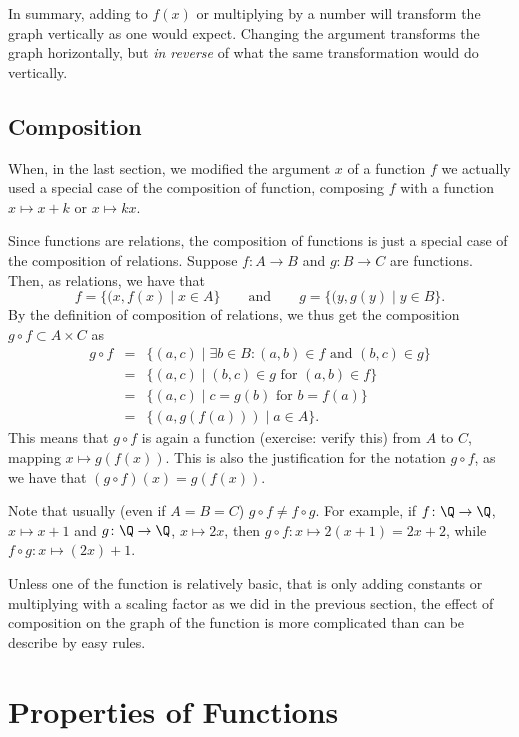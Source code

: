In summary, adding to $f(x)$ or multiplying by a number will transform the graph
vertically as one would expect. Changing the argument transforms the graph horizontally,
but {\em in reverse} of what the same transformation would do vertically.

\subsection{Composition}
\label{secfunccomposition}

When, in the last section, we modified the argument $x$ of a function $f$ we actually
used a special case of the composition of function, composing $f$ with a function
$x\mapsto x+k$ or $x\mapsto kx$.

Since functions are relations, the composition of functions is just a special case of
the composition of relations. Suppose $f\colon A\to B$ and $g\colon B\to C$ are
functions. Then, as relations, we have that 
\[
f=\{(x,f(x)\mid x\in A\}
\qquad\mbox{and}\qquad
g=\{(y,g(y)\mid y\in B\}.
\]
By the definition of composition of relations, we thus get the composition $g\circ
f\subset A\times C$ as
\begin{eqnarray*}
g\circ f&=&\{(a,c)\mid \exists b\in B:(a,b)\in f \mbox{\ and\ }(b,c)\in g\}\\
&=&\{(a,c)\mid (b,c)\in g \mbox{\ for\ }(a,b)\in f\}\\
&=&\{(a,c)\mid c=g(b) \mbox{\ for\ }b=f(a)\}\\
&=&\{(a,g(f(a)))\mid a\in A\}.
\end{eqnarray*}
This means that $g\circ f$ is again a function (exercise: verify this) from
$A$ to $C$, mapping $x\mapsto g(f(x))$. This is also the justification for the notation
$g\circ f$, as we have that $(g\circ f)(x)=g(f(x))$.
\smallskip

Note that usually (even if $A=B=C$) $g\circ f\not=f\circ g$. For example, if
$f\colon\Q\to\Q$, $x\mapsto x+1$ and 
$g\colon\Q\to\Q$, $x\mapsto 2x$, then $g\circ f\colon x\mapsto 2(x+1)=2x+2$, while
$f\circ g\colon x\mapsto (2x)+1$.
\smallskip

Unless one of the function is relatively basic, that is only adding constants or multiplying with a scaling factor as we did
in the previous section, the effect of composition on the graph of the function is more
complicated than can be describe by easy rules.

\section{Properties of Functions}

